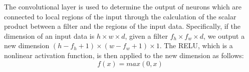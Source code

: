 The convolutional layer is used to determine the output of neurons which are connected to local regions of the input through the calculation of the scalar product between a filter and the regions of the input data. Specifically, if the dimension of an input data is $h \times w \times d$, given a filter $f_h \times f_w \times d$, we output a new dimension $(h - f_h + 1) \times (w - f_w + 1) \times 1$. The RELU, which is a nonlinear activation function, is then applied to the new dimension as follows: 
\begin{equation}
\label{eq:relu}
f(x) = max(0, x)   
\end{equation}




